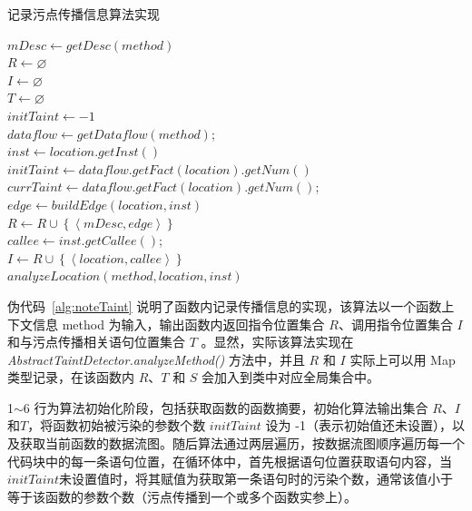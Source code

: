 \begin{algorithm}[!htb]\footnotesize
\caption{记录污点传播信息算法实现}
\label{alg:noteTaint}
$mDesc \leftarrow getDesc(method)$\\
$R \leftarrow \varnothing $\\
$I \leftarrow \varnothing $\\
$T \leftarrow \varnothing $\\
$initTaint \leftarrow -1$\\
$dataflow \leftarrow getDataflow(method)$;\\
 {
     {
        $inst \leftarrow location.getInst()$\\
         {
            $initTaint \leftarrow dataflow.getFact(location).getNum()$\\
        }
         {
            $currTaint \leftarrow dataflow.getFact(location).getNum()$;\\
             {
                $edge \leftarrow buildEdge(location, inst)$\\
                $R \leftarrow R \cup \left\{ \left\langle mDesc, edge \right\rangle \right\}$\\
            }
        }
         {
            $callee \leftarrow inst.getCallee()$;\\
            $I \leftarrow R \cup \left\{ \left\langle location, callee \right\rangle \right\}$\\
            $analyzeLocation(method, location, inst)$\\
        }
    }
}
\end{algorithm}

伪代码~\ref{alg:noteTaint} 说明了函数内记录传播信息的实现，该算法以一个函数上下文信息 method 为输入，输出函数内返回指令位置集合 $R$、调用指令位置集合 $I$ 和与污点传播相关语句位置集合 $T$ 。显然，实际该算法实现在 \textit{AbstractTaintDetector.analyzeMethod()} 方法中，并且 $R$ 和 $I$ 实际上可以用 Map 类型记录，在该函数内 $R$、$T$ 和 $S$ 会加入到类中对应全局集合中。

1$\sim$6 行为算法初始化阶段，包括获取函数的函数摘要，初始化算法输出集合 $R$、$I$和$T$，将函数初始被污染的参数个数 $initTaint$ 设为 -1（表示初始值还未设置），以及获取当前函数的数据流图。随后算法通过两层遍历，按数据流图顺序遍历每一个代码块中的每一条语句位置，在循环体中，首先根据语句位置获取语句内容，当$initTaint$未设置值时，将其赋值为获取第一条语句时的污染个数，通常该值小于等于该函数的参数个数（污点传播到一个或多个函数实参上）。

